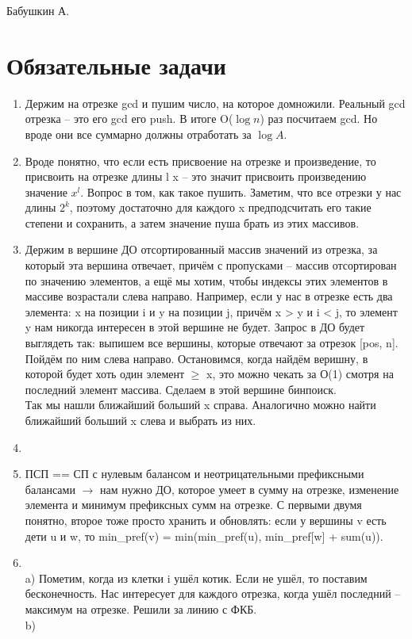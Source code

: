 \documentclass[12pt]{article}
\begin{document}
\def\t{\texttt}

Бабушкин А.

\section{Обязательные задачи}

\begin{enumerate}
	\setlength{\parskip}{0pt} 
	\setlength{\itemsep}{0pt} 
	\item Держим на отрезке gcd и пушим число, на которое домножили. Реальный gcd отрезка -- это его gcd \* его push. В итоге O($\log n$) раз 
    посчитаем gcd. Но вроде они все суммарно должны отработать за $\log A$. \\
    \item Вроде понятно, что если есть присвоение на отрезке и произведение, то присвоить на отрезке длины l x -- это значит присвоить произведению 
    значение $x^l$. Вопрос в том, как такое пушить. Заметим, что все отрезки у нас длины $2^k$, поэтому достаточно для каждого x предподсчитать его такие степени 
    и сохранить, а затем значение пуша брать из этих массивов. \\
    \item Держим в вершине ДО отсортированный массив значений из отрезка, за который эта вершина отвечает, причём с пропусками -- массив отсортирован по значению 
    элементов, а ещё мы хотим, чтобы индексы этих элементов в массиве возрастали слева направо. Например, если у нас в отрезке есть два элемента: 
    x на позиции i и y на позиции j, причём x > y и i < j, то элемент y нам никогда интересен в этой вершине не будет. Запрос в ДО будет выглядеть так: 
    выпишем все вершины, которые отвечают за отрезок [pos, n]. Пойдём по ним слева направо. Остановимся, когда найдём веришну, в которой будет хоть один 
    элемент $\ge$ x, это можно чекать за О(1) смотря на последний элемент массива. Сделаем в этой вершине бинпоиск. \\
    Так мы нашли ближайший больший x справа. Аналогично можно найти ближайший больший x слева и выбрать из них. \\
    \item ~\\
    \item ПСП == СП с нулевым балансом и неотрицательными префиксными балансами $\to$ нам нужно ДО, которое умеет в сумму на отрезке, изменение элемента 
    и минимум префиксных сумм на отрезке. С первыми двумя понятно, второе тоже просто хранить и обновлять: если у вершины v есть дети u и w, то min\_pref(v) = 
    min(min\_pref(u), min\_pref[w] + sum(u)). \\
    \item ~\\
    a) Пометим, когда из клетки i ушёл котик. Если не ушёл, то поставим бесконечность. Нас интересует для каждого отрезка, когда ушёл последний -- 
    максимум на отрезке. Решили за линию с ФКБ. \\
    b) ~\\
\end{enumerate}
\end{document}
